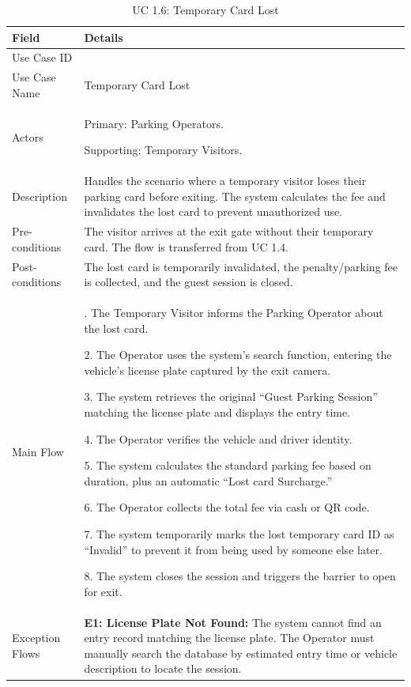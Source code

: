 \begin{table}[H]
\small
\renewcommand{\arraystretch}{1.4}
\begin{tabularx}{\textwidth}{|>{\raggedright\arraybackslash}p{3.5cm}|>{\RaggedRight\arraybackslash}X|}
\hline
\rowcolor{gray!20} \textbf{Field} & \textbf{Details} \\
\hline
Use Case ID & 1.6 \\
\hline
Use Case Name & Temporary Card Lost \\
\hline
Actors & Primary: Parking Operators. \par Supporting: Temporary Visitors. \\
\hline
Description & Handles the scenario where a temporary visitor loses their parking card before exiting. The system calculates the fee and invalidates the lost card to prevent unauthorized use. \\
\hline
Pre-conditions & The visitor arrives at the exit gate without their temporary card. The flow is transferred from UC 1.4. \\
\hline
Post-conditions & The lost card is temporarily invalidated, the penalty/parking fee is collected, and the guest session is closed. \\
\hline
Main Flow & 
1. The Temporary Visitor informs the Parking Operator about the lost card. \par
2. The Operator uses the system's search function, entering the vehicle's license plate captured by the exit camera. \par
3. The system retrieves the original ``Guest Parking Session'' matching the license plate and displays the entry time. \par
4. The Operator verifies the vehicle and driver identity. \par
5. The system calculates the standard parking fee based on duration, plus an automatic ``Lost card Surcharge.'' \par
6. The Operator collects the total fee via cash or QR code. \par
7. The system temporarily marks the lost temporary card ID as ``Invalid'' to prevent it from being used by someone else later. \par
8. The system closes the session and triggers the barrier to open for exit. \\
\hline
Exception Flows & 
\textbf{E1: License Plate Not Found:} The system cannot find an entry record matching the license plate. The Operator must manually search the database by estimated entry time or vehicle description to locate the session. \\
\hline
\end{tabularx}
\caption{UC 1.6: Temporary Card Lost}
\label{tab:uc1.6}
\end{table}